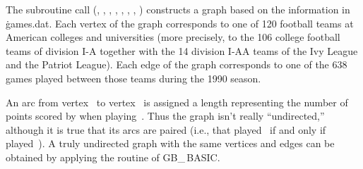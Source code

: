 The subroutine call (, , , ,
, , , )
constructs a graph based on the information in \.{games.dat}.
Each vertex of the graph corresponds to one of 120 football teams
at American colleges and universities (more precisely, to the 106 college
football teams of division I-A together with the 14 division I-AA teams
of the Ivy League and the Patriot League).
Each edge of the graph corresponds to one of the 638 games played
between those teams during the 1990 season.

An arc from vertex~ to vertex~ is assigned a length
representing
the number of points scored by  when playing~. Thus the graph
isn't really ``undirected,'' although it is true that its arcs are
paired (i.e., that  played~ if and only if  played~).
A truly undirected graph with the same vertices and edges can be obtained
by applying the  routine of {\sc GB\_\,BASIC}.

